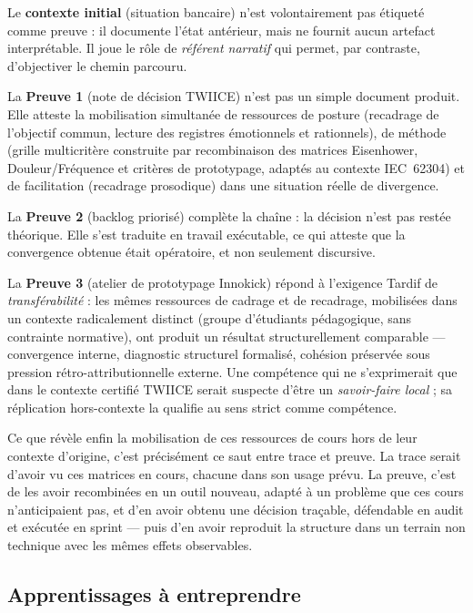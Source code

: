 Le \textbf{contexte initial} (situation bancaire) n'est volontairement pas étiqueté comme preuve : il documente l'état antérieur, mais ne fournit aucun artefact interprétable. Il joue le rôle de \emph{référent narratif} qui permet, par contraste, d'objectiver le chemin parcouru.

La \textbf{Preuve 1} (note de décision TWIICE) n'est pas un simple document produit. Elle atteste la mobilisation simultanée de ressources de posture (recadrage de l'objectif commun, lecture des registres émotionnels et rationnels), de méthode (grille multicritère construite par recombinaison des matrices Eisenhower, Douleur/Fréquence et critères de prototypage, adaptés au contexte IEC~62304) et de facilitation (recadrage prosodique) dans une situation réelle de divergence.

La \textbf{Preuve 2} (backlog priorisé) complète la chaîne : la décision n'est pas restée théorique. Elle s'est traduite en travail exécutable, ce qui atteste que la convergence obtenue était opératoire, et non seulement discursive.

La \textbf{Preuve 3} (atelier de prototypage Innokick) répond à l'exigence Tardif de \emph{transférabilité} : les mêmes ressources de cadrage et de recadrage, mobilisées dans un contexte radicalement distinct (groupe d'étudiants pédagogique, sans contrainte normative), ont produit un résultat structurellement comparable --- convergence interne, diagnostic structurel formalisé, cohésion préservée sous pression rétro-attributionnelle externe. Une compétence qui ne s'exprimerait que dans le contexte certifié TWIICE serait suspecte d'être un \emph{savoir-faire local} ; sa réplication hors-contexte la qualifie au sens strict comme compétence.

Ce que révèle enfin la mobilisation de ces ressources de cours hors de leur contexte d'origine, c'est précisément ce saut entre trace et preuve. La trace serait d'avoir vu ces matrices en cours, chacune dans son usage prévu. La preuve, c'est de les avoir recombinées en un outil nouveau, adapté à un problème que ces cours n'anticipaient pas, et d'en avoir obtenu une décision traçable, défendable en audit et exécutée en sprint --- puis d'en avoir reproduit la structure dans un terrain non technique avec les mêmes effets observables.

\subsection{Apprentissages à entreprendre}

